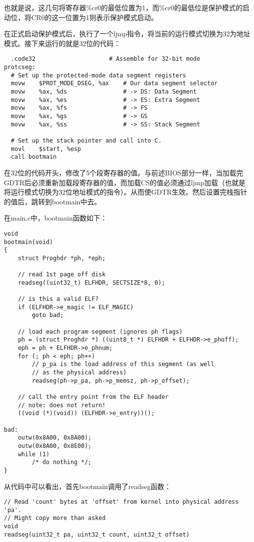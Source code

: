 \begin{exerciseSolution}{3}
\par 也就是说，这几句将寄存器\%cr0的最低位置为1，而\%cr0的最低位是保护模式的启动位，将CR0的这一位置为1则表示保护模式启动。
\par 在正式启动保护模式后，执行了一个ljmp指令，将当前的运行模式切换为32为地址模式。接下来运行的就是32位的代码：

\begin{lstlisting}
  .code32                     # Assemble for 32-bit mode
protcseg:
  # Set up the protected-mode data segment registers
  movw    $PROT_MODE_DSEG, %ax    # Our data segment selector
  movw    %ax, %ds                # -> DS: Data Segment
  movw    %ax, %es                # -> ES: Extra Segment
  movw    %ax, %fs                # -> FS
  movw    %ax, %gs                # -> GS
  movw    %ax, %ss                # -> SS: Stack Segment

  # Set up the stack pointer and call into C.
  movl    $start, %esp
  call bootmain
\end{lstlisting}
\par 在32位的代码开头，修改了5个段寄存器的值。与前述BIOS部分一样，当加载完GDTR后必须重新加载段寄存器的值，而加载CS的值必须通过ljmp加载（也就是将运行模式切换为32位地址模式的指令）。从而使GDTR生效。然后设置完栈指针的值后，跳转到bootmain中去。

\par 在main.c中，bootmain函数如下：
\begin{lstlisting}
void
bootmain(void)
{
    struct Proghdr *ph, *eph;

    // read 1st page off disk
    readseg((uint32_t) ELFHDR, SECTSIZE*8, 0);

    // is this a valid ELF?
    if (ELFHDR->e_magic != ELF_MAGIC)
        goto bad;

    // load each program segment (ignores ph flags)
    ph = (struct Proghdr *) ((uint8_t *) ELFHDR + ELFHDR->e_phoff);
    eph = ph + ELFHDR->e_phnum;
    for (; ph < eph; ph++)
        // p_pa is the load address of this segment (as well
        // as the physical address)
        readseg(ph->p_pa, ph->p_memsz, ph->p_offset);

    // call the entry point from the ELF header
    // note: does not return!
    ((void (*)(void)) (ELFHDR->e_entry))();

bad:
    outw(0x8A00, 0x8A00);
    outw(0x8A00, 0x8E00);
    while (1)
        /* do nothing */;
}
\end{lstlisting}

\par 从代码中可以看出，首先bootmain调用了readseg函数：
\begin{lstlisting}
// Read 'count' bytes at 'offset' from kernel into physical address 'pa'.
// Might copy more than asked
void
readseg(uint32_t pa, uint32_t count, uint32_t offset)
\end{lstlisting}


\end{exerciseSolution}

